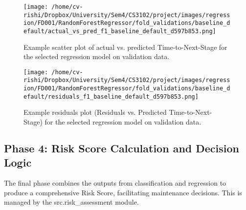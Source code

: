 \begin{figure}[t]
	\centering
	\texttt{[image: /home/cv-rishi/Dropbox/University/Sem4/CS3102/project/images/regression/FD001/RandomForestRegressor/fold\_validations/baseline\_default/actual\_vs\_pred\_f1\_baseline\_default\_d597b853.png]}
	\caption{Example scatter plot of actual vs. predicted Time-to-Next-Stage for the selected regression model on validation data.}
	\label{fig:actual_vs_pred}
\end{figure}

\begin{figure}[t]
	\centering
	\texttt{[image: /home/cv-rishi/Dropbox/University/Sem4/CS3102/project/images/regression/FD001/RandomForestRegressor/fold\_validations/baseline\_default/residuals\_f1\_baseline\_default\_d597b853.png]}
	\caption{Example residuals plot (Residuals vs. Predicted Time-to-Next-Stage) for the selected regression model on validation data.}
	\label{fig:residuals}
\end{figure}

\subsection{Phase 4: Risk Score Calculation and Decision Logic}
\label{subsec:risk_score}
The final phase combines the outputs from classification and regression to produce a comprehensive Risk Score, facilitating maintenance decisions. This is managed by the src.risk\_assessment module.

